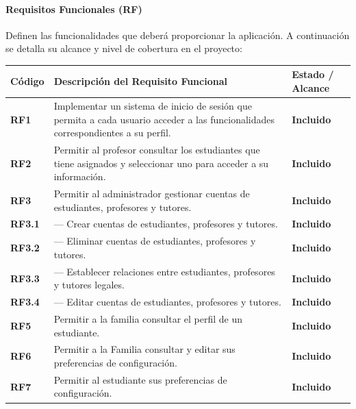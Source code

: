 \paragraph{Requisitos Funcionales (RF)}
Definen las funcionalidades que deberá proporcionar la aplicación. A continuación se detalla su alcance y nivel de cobertura en el proyecto:

\begin{xltabular}{\textwidth}{|p{2.2cm}|X|p{2.8cm}|}
\hline
{}
\textbf{Código} & \textbf{Descripción del Requisito Funcional} & \textbf{Estado / Alcance} \\ \hline
\endhead

\hline
\endfoot

\textbf{RF1} & Implementar un sistema de inicio de sesión que permita a cada usuario acceder a las funcionalidades correspondientes a su perfil. & \textbf{Incluido} \\ \hline
\textbf{RF2} & Permitir al profesor consultar los estudiantes que tiene asignados y seleccionar uno para acceder a su información. & \textbf{Incluido} \\ \hline
\textbf{RF3} & Permitir al administrador gestionar cuentas de estudiantes, profesores y tutores. & \textbf{Incluido} \\ \hline
\textbf{RF3.1} & --- Crear cuentas de estudiantes, profesores y tutores. & \textbf{Incluido} \\ \hline
\textbf{RF3.2} & --- Eliminar cuentas de estudiantes, profesores y tutores. & \textbf{Incluido} \\ \hline
\textbf{RF3.3} & --- Establecer relaciones entre estudiantes, profesores y tutores legales. & \textbf{Incluido} \\ \hline
\textbf{RF3.4} & --- Editar cuentas de estudiantes, profesores y tutores. & \textbf{Incluido} \\ \hline
\textbf{RF5} & Permitir a la familia consultar el perfil de un estudiante. & \textbf{Incluido} \\ \hline
\textbf{RF6} & Permitir a la Familia consultar y editar sus preferencias de configuración. & \textbf{Incluido} \\ \hline
\textbf{RF7} & Permitir al estudiante sus preferencias de configuración. & \textbf{Incluido} \\ \hline

\end{xltabular}
